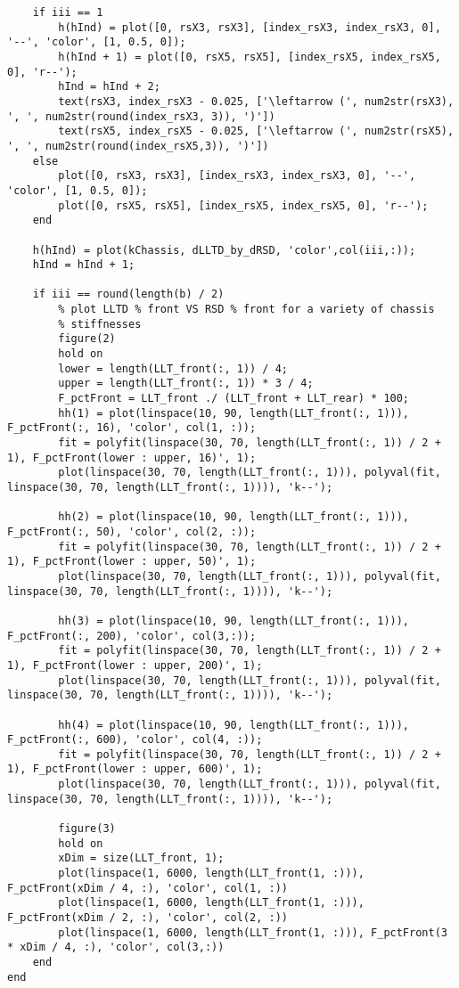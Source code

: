 \begin{lstlisting}
	if iii == 1
		h(hInd) = plot([0, rsX3, rsX3], [index_rsX3, index_rsX3, 0], '--', 'color', [1, 0.5, 0]);
		h(hInd + 1) = plot([0, rsX5, rsX5], [index_rsX5, index_rsX5, 0], 'r--');
		hInd = hInd + 2;
		text(rsX3, index_rsX3 - 0.025, ['\leftarrow (', num2str(rsX3), ', ', num2str(round(index_rsX3, 3)), ')'])
		text(rsX5, index_rsX5 - 0.025, ['\leftarrow (', num2str(rsX5), ', ', num2str(round(index_rsX5,3)), ')'])
	else
		plot([0, rsX3, rsX3], [index_rsX3, index_rsX3, 0], '--', 'color', [1, 0.5, 0]);
		plot([0, rsX5, rsX5], [index_rsX5, index_rsX5, 0], 'r--');
	end
	
	h(hInd) = plot(kChassis, dLLTD_by_dRSD, 'color',col(iii,:));
	hInd = hInd + 1;
	
	if iii == round(length(b) / 2)
		% plot LLTD % front VS RSD % front for a variety of chassis
		% stiffnesses 
		figure(2)
		hold on
		lower = length(LLT_front(:, 1)) / 4;
		upper = length(LLT_front(:, 1)) * 3 / 4;
		F_pctFront = LLT_front ./ (LLT_front + LLT_rear) * 100;
		hh(1) = plot(linspace(10, 90, length(LLT_front(:, 1))), F_pctFront(:, 16), 'color', col(1, :));
		fit = polyfit(linspace(30, 70, length(LLT_front(:, 1)) / 2 + 1), F_pctFront(lower : upper, 16)', 1);
		plot(linspace(30, 70, length(LLT_front(:, 1))), polyval(fit, linspace(30, 70, length(LLT_front(:, 1)))), 'k--');
		
		hh(2) = plot(linspace(10, 90, length(LLT_front(:, 1))), F_pctFront(:, 50), 'color', col(2, :));
		fit = polyfit(linspace(30, 70, length(LLT_front(:, 1)) / 2 + 1), F_pctFront(lower : upper, 50)', 1);
		plot(linspace(30, 70, length(LLT_front(:, 1))), polyval(fit, linspace(30, 70, length(LLT_front(:, 1)))), 'k--');
		
		hh(3) = plot(linspace(10, 90, length(LLT_front(:, 1))), F_pctFront(:, 200), 'color', col(3,:));
		fit = polyfit(linspace(30, 70, length(LLT_front(:, 1)) / 2 + 1), F_pctFront(lower : upper, 200)', 1);
		plot(linspace(30, 70, length(LLT_front(:, 1))), polyval(fit, linspace(30, 70, length(LLT_front(:, 1)))), 'k--');
		
		hh(4) = plot(linspace(10, 90, length(LLT_front(:, 1))), F_pctFront(:, 600), 'color', col(4, :));
		fit = polyfit(linspace(30, 70, length(LLT_front(:, 1)) / 2 + 1), F_pctFront(lower : upper, 600)', 1);
		plot(linspace(30, 70, length(LLT_front(:, 1))), polyval(fit, linspace(30, 70, length(LLT_front(:, 1)))), 'k--');
		
		figure(3)
		hold on
		xDim = size(LLT_front, 1);
		plot(linspace(1, 6000, length(LLT_front(1, :))), F_pctFront(xDim / 4, :), 'color', col(1, :))
		plot(linspace(1, 6000, length(LLT_front(1, :))), F_pctFront(xDim / 2, :), 'color', col(2, :))
		plot(linspace(1, 6000, length(LLT_front(1, :))), F_pctFront(3 * xDim / 4, :), 'color', col(3,:))
	end
end


\end{lstlisting}
